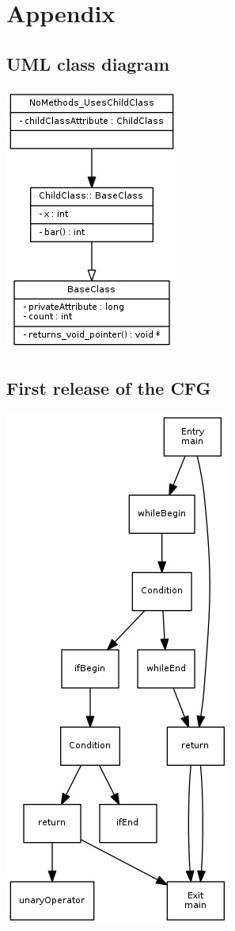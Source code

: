 \documentclass[conference,compsoc]{IEEEtran}
\begin{document}
\section{Appendix}
\subsection{UML class diagram}
\includegraphics{uml}
\subsection{First release of the CFG}
\includegraphics{cfg}
\end{document}
